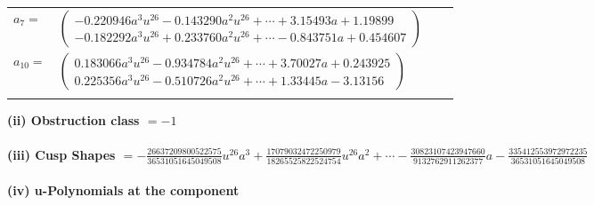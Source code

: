 \documentclass[1p]{elsarticle_modified}
\theoremstyle{definition}
\begin{document}
\begin{tabular}{m{7pt} m{180pt} m{7pt} m{180pt} }
\flushright $a_{7}=$&$\begin{pmatrix}-0.220946 a^{3} u^{26}-0.143290 a^{2} u^{26}+\cdots+3.15493 a+1.19899\\-0.182292 a^{3} u^{26}+0.233760 a^{2} u^{26}+\cdots-0.843751 a+0.454607\end{pmatrix}$ \\
\flushright $a_{10}=$&$\begin{pmatrix}0.183066 a^{3} u^{26}-0.934784 a^{2} u^{26}+\cdots+3.70027 a+0.243925\\0.225356 a^{3} u^{26}-0.510726 a^{2} u^{26}+\cdots+1.33445 a-3.13156\end{pmatrix}$\\&\end{tabular}
\flushleft \textbf{(ii) Obstruction class $= -1$}\\~\\
\flushleft \textbf{(iii) Cusp Shapes $= -\frac{26637209800522575}{36531051645049508} u^{26} a^3+\frac{17079032472250979}{18265525822524754} u^{26} a^2+\cdots-\frac{30823107423947660}{9132762911262377} a-\frac{335412553972972235}{36531051645049508}$}\\~\\
\newpage\renewcommand{\arraystretch}{1}
\flushleft \textbf{(iv) u-Polynomials at the component}\newline \\
\end{document}
